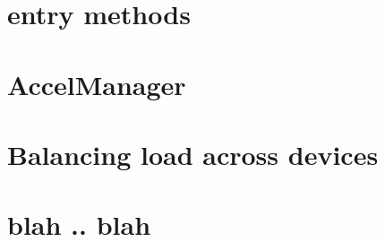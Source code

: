 \section{ entry methods}
\section{AccelManager}
\section{Balancing load across devices}
\section{blah .. blah}

